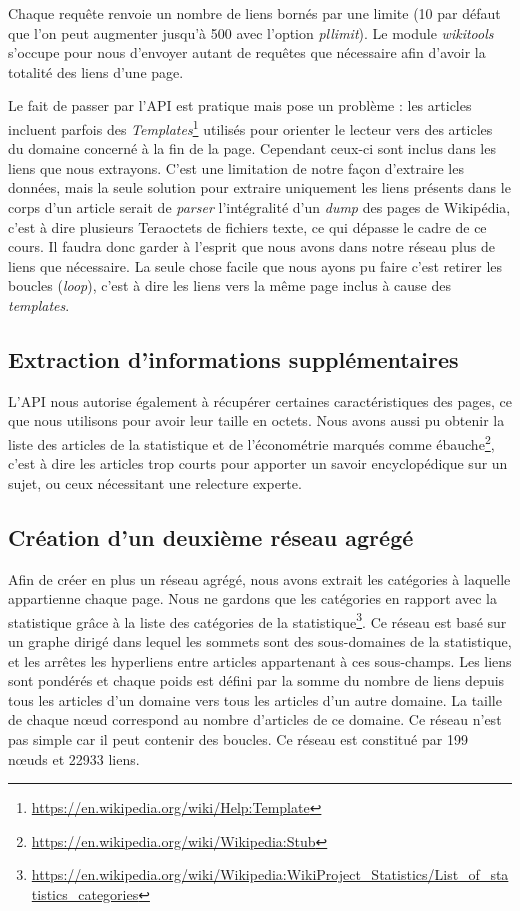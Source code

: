 \documentclass[a4paper]{article}
\begin{document}
Chaque requête renvoie un nombre de liens bornés par une limite (10 par défaut que l'on peut augmenter jusqu'à 500 avec l'option \textit{pllimit}). Le module \textit{wikitools} s'occupe pour nous d'envoyer autant de requêtes que nécessaire afin d'avoir la totalité des liens d'une page.

Le fait de passer par l'API est pratique mais pose un problème : les articles incluent parfois des \textit{Templates}\footnote{\url{https://en.wikipedia.org/wiki/Help:Template}} utilisés pour orienter le lecteur vers des articles du domaine concerné à la fin de la page. Cependant ceux-ci sont inclus dans les liens que nous extrayons. C'est une limitation de notre façon d'extraire les données, mais la seule solution pour extraire uniquement les liens présents dans le corps d'un article serait de \textit{parser} l'intégralité d'un \textit{dump} des pages de Wikipédia, c'est à dire plusieurs Teraoctets de fichiers texte, ce qui dépasse le cadre de ce cours. Il faudra donc garder à l'esprit que nous avons dans notre réseau plus de liens que nécessaire. La seule chose facile que nous ayons pu faire c'est retirer les boucles (\textit{loop}), c'est à dire les liens vers la même page inclus à cause des \textit{templates}.

    \subsection{Extraction d'informations supplémentaires}

L'API nous autorise également à récupérer certaines caractéristiques des pages, ce que nous utilisons pour avoir leur taille en octets. Nous avons aussi pu obtenir la liste des articles de la statistique et de l'économétrie marqués comme ébauche\footnote{\url{https://en.wikipedia.org/wiki/Wikipedia:Stub}}, c'est à dire les articles trop courts pour apporter un savoir encyclopédique sur un sujet, ou ceux nécessitant une relecture experte. 

    \subsection{Création d'un deuxième réseau agrégé}
    \label{title:reseau-agg}

Afin de créer en plus un réseau agrégé, nous avons extrait les catégories à laquelle appartienne chaque page. Nous ne gardons que les catégories en rapport avec la statistique grâce à la liste des catégories de la statistique\footnote{\url{https://en.wikipedia.org/wiki/Wikipedia:WikiProject_Statistics/List_of_statistics_categories}}. Ce réseau est basé sur un graphe dirigé dans lequel les sommets sont des sous-domaines de la statistique, et les arrêtes les hyperliens entre articles appartenant à ces sous-champs. Les liens sont pondérés et chaque poids est défini par la somme du nombre de liens depuis tous les articles d'un domaine vers tous les articles d'un autre domaine. La taille de chaque nœud correspond au nombre d'articles de ce domaine. Ce réseau n'est pas simple car il peut contenir des boucles. Ce réseau est constitué par 199 nœuds et 22933 liens.
\end{document}
